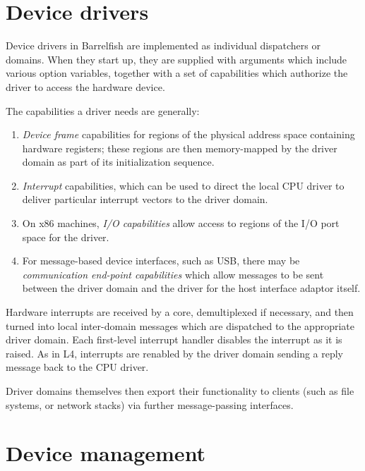 \documentclass[a4paper,twoside]{report} %
\begin{document}
\section{Device drivers}

Device drivers in Barrelfish are implemented as individual dispatchers
or domains.  When they start up, they are supplied with arguments
which include various option variables, together with a set of
capabilities which authorize the driver to access the hardware device.

The capabilities a driver needs are generally:
\begin{enumerate}
\item \emph{Device frame} capabilities for regions of the physical
  address space containing hardware registers; these regions are then
  memory-mapped by the driver domain as part of its initialization
  sequence. 
\item \emph{Interrupt} capabilities, which can be used to direct the
  local CPU driver to deliver particular interrupt vectors to the
  driver domain. 
\item On x86 machines, \emph{I/O capabilities} allow access to regions
  of the I/O port space for the driver. 
\item For message-based device interfaces, such as USB, there may be
  \emph{communication end-point capabilities} which allow messages to
  be sent between the driver domain and the driver for the host
  interface adaptor itself. 
\end{enumerate}

Hardware interrupts are received by a core, demultiplexed if
necessary, and then turned into local inter-domain messages which are
dispatched to the appropriate driver domain.  Each first-level
interrupt handler disables the interrupt as it is raised.  As in L4,
interrupts are renabled by the driver domain sending a reply message
back to the CPU driver. 

Driver domains themselves then export their functionality to clients
(such as file systems, or network stacks) via further message-passing
interfaces. 

\section{Device management}
\end{document}
